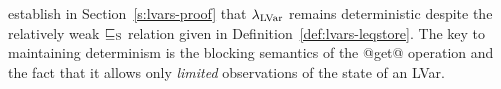  establish in Section~\ref{s:lvars-proof} that $\lambda_{\textrm{LVar}}$ remains
deterministic despite the relatively weak $ \sqsubseteq_{\mathrm{S}} $ relation
given in Definition~\ref{def:lvars-leqstore}.  The key to maintaining
determinism is the blocking semantics of the @get@ operation and the
fact that it allows only \emph{limited} observations of the state of
an LVar.
